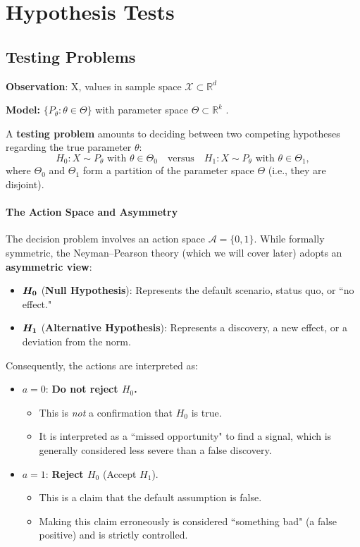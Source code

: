 \chapter{Hypothesis Tests}
\label{cha:hypothesis_tests}

\section{Testing Problems}%
\label{sec:testing_problems}

\textbf{Observation}: X, values in sample space
\(\mathcal{X} \subset \mathbb{R}^d\)

\textbf{Model:} \(\{P_{\theta} : \theta \in \Theta\}\) with parameter
space \(\Theta \subset \mathbb{R}^k\) .


A \textbf{testing problem} amounts to deciding between two competing hypotheses regarding the true parameter $\theta$:
\[
H_0: X \sim P_{\theta} \text{ with } \theta \in \Theta_0 \quad \text{versus} \quad H_1: X \sim P_{\theta} \text{ with } \theta \in \Theta_1,
\]
where $\Theta_0$ and $\Theta_1$ form a partition of the parameter space $\Theta$ (i.e., they are disjoint).

\subsubsection{The Action Space and Asymmetry}

The decision problem involves an action space $\mathcal{A} = \{0, 1\}$. While formally symmetric, the Neyman--Pearson theory (which we will cover later) adopts an \textbf{asymmetric view}:

\begin{itemize}
    \item $\boldsymbol{H_0}$ (\textbf{Null Hypothesis}): Represents the default scenario, status quo, or ``no effect."
    \item $\boldsymbol{H_1}$ (\textbf{Alternative Hypothesis}): Represents a discovery, a new effect, or a deviation from the norm.
\end{itemize}

Consequently, the actions are interpreted as:
\begin{itemize}
    \item $a = 0$: \textbf{Do not reject $H_0$.}
    \begin{itemize}
        \item This is \emph{not} a confirmation that $H_0$ is true.
        \item It is interpreted as a ``missed opportunity" to find a signal, which is generally considered less severe than a false discovery.
    \end{itemize}
    \item $a = 1$: \textbf{Reject $H_0$} (Accept $H_1$).
    \begin{itemize}
        \item This is a claim that the default assumption is false.
        \item Making this claim erroneously is considered ``something bad" (a false positive) and is strictly controlled.
    \end{itemize}
\end{itemize}

